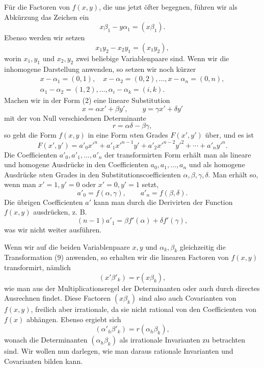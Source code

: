 \documentclass[11pt]{article}
\begin{document}
Für die Factoren von $f(x,y)$, die uns jetzt öfter begegnen, führen wir als Abkürzung das Zeichen ein
\begin{equation}
 x\beta_1-y\alpha_1=(x\beta_1).
\tag{6}
\end{equation}
Ebenso werden wir setzen
\begin{equation}
 x_1y_2-x_2y_1=(x_1y_2),
\tag{7}
\end{equation}
worin $x_1,y_1$ und $x_2,y_2$ zwei beliebige Variablenpaare sind. Wenn wir die inhomogene Darstellung anwenden, so setzen wir noch kürzer
\begin{equation}
\begin{gathered}
 x-\alpha_1=(0,1),\quad x-\alpha_2=(0,2),\ldots,x-\alpha_n=(0,n),\\
 \alpha_1-\alpha_2=(1,2),\ldots,\alpha_i-\alpha_k=(i,k).
\end{gathered}
\tag{8}
\end{equation}
Machen wir in der Form (2) eine lineare Substitution
\begin{equation}
 x=\alpha x'+\beta y',
 \qquad
 y=\gamma x'+\delta y'
\tag{9}
\end{equation}
mit der von Null verschiedenen Determinante
\begin{equation}
 r=\alpha\delta-\beta\gamma,
\tag{10}
\end{equation}
so geht die Form $f(x,y)$ in eine Form $n$ten Grades $F(x',y')$ über, und es ist
\begin{equation}
 F(x',y')=a'_0x'^n+a'_1x'^{n-1}y'+a'_2x'^{n-2}y'^2+\cdots+a'_ny'^n.
\tag{11}
\end{equation}
Die Coefficienten $a'_0,a'_1,\ldots,a'_n$ der transformirten Form erhält man als lineare und homogene Ausdrücke in den Coefficienten $a_0,a_1,\ldots,a_n$ und als homogene Ausdrücke $n$ten Grades in den Substitutionscoefficienten $\alpha,\beta,\gamma,\delta$. Man erhält so, wenn man $x'=1,y'=0$ oder $x'=0,y'=1$ setzt,
\begin{equation}
 a'_0=f(\alpha,\gamma),
 \qquad
 a'_n=f(\beta,\delta).
\tag{12}
\end{equation}
Die übrigen Coefficienten $a'$ kann man durch die Derivirten der Function $f(x,y)$ ausdrücken, z. B.
\[
 (n-1)a'_1=\beta f'(\alpha)+\delta f'(\gamma),
\]
was wir nicht weiter ausführen.

Wenn wir auf die beiden Variablenpaare $x,y$ und $\alpha_k,\beta_k$ gleichzeitig die Transformation (9) anwenden, so erhalten wir die linearen Factoren von $f(x,y)$ transformirt, nämlich
\begin{equation}
 (x'\beta'_k)=r(x\beta_k),
\tag{13}
\end{equation}
wie man aus der Multiplicationsregel der Determinanten oder auch durch directes Ausrechnen findet. Diese Factoren $(x\beta_k)$ sind also auch Covarianten von $f(x,y)$, freilich aber irrationale, da sie nicht rational von den Coefficienten von $f(x)$ abhängen. Ebenso ergiebt sich
\begin{equation}
 (\alpha'_h\beta'_k)=r(\alpha_h\beta_k),
\tag{14}
\end{equation}
wonach die Determinanten $(\alpha_h\beta_k)$ als irrationale Invarianten zu betrachten sind. Wir wollen nun darlegen, wie man daraus rationale Invarianten und Covarianten bilden kann.
\end{document}
